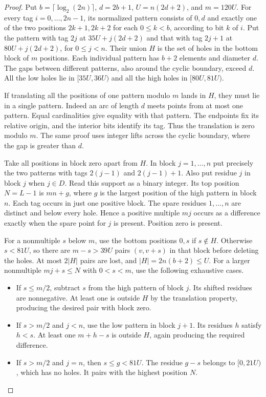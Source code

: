 \documentclass[11pt,letterpaper]{article}
\numberwithin{equation}{section}
\begin{document}
\begin{proof}

Put \(b=\lceil\log_2(2n)\rceil\), \(d=2b+1\), \(U=n(2d+2)\), and \(m=120U\). For every tag
\(i=0,\ldots,2n-1\), its normalized pattern consists of \(0,d\) and exactly one of the two
positions \(2k+1,2k+2\) for each \(0\le k<b\), according to bit \(k\) of \(i\). Put the
pattern with tag \(2j\) at \(35U+j(2d+2)\) and that with tag \(2j+1\) at \(80U+j(2d+2)\), for
\(0\le j<n\). Their union \(H\) is the set of holes in the bottom block of \(m\) positions.
Each individual pattern has \(b+2\) elements and diameter \(d\). The gaps between different
patterns, also around the cyclic boundary, exceed \(d\). All the low holes lie in
\([35U,36U)\) and all the high holes in \([80U,81U)\).

If translating all the positions of one pattern modulo \(m\) lands in \(H\), they must lie in
a single pattern. Indeed an arc of length \(d\) meets points from at most one pattern. Equal
cardinalities give equality with that pattern. The endpoints fix its relative origin, and the
interior bits identify its tag. Thus the translation is zero modulo \(m\). The same proof uses
integer lifts across the cyclic boundary, where the gap is greater than \(d\).

Take all positions in block zero apart from \(H\). In block \(j=1,\ldots,n\) put precisely the
two patterns with tags \(2(j-1)\) and \(2(j-1)+1\). Also put residue \(j\) in block \(j\) when
\(j\in D\). Read this support as a binary integer. Its top position \(N=L-1\) is \(mn+g\),
where \(g\) is the largest position of the high pattern in block \(n\). Each tag occurs in
just one positive block. The spare residues \(1,\ldots,n\) are distinct and below every hole.
Hence a positive multiple \(mj\) occurs as a difference exactly when the spare point for \(j\)
is present. Position zero is present.

For a nonmultiple \(s\) below \(m\), use the bottom positions \(0,s\) if \(s\notin H\).
Otherwise \(s<81U\), so there are \(m-s>39U\) pairs \((v,v+s)\) in that block before deleting
the holes. At most \(2|H|\) pairs are lost, and \(|H|=2n(b+2)\le U\). For a larger nonmultiple
\(mj+s\le N\) with \(0<s<m\), use the following exhaustive cases.

\begin{itemize}
\item If \(s\le m/2\), subtract \(s\) from the high pattern of block \(j\). Its shifted residues are nonnegative. At least one is outside \(H\) by the translation property, producing the desired pair with block zero.
\item If \(s>m/2\) and \(j<n\), use the low pattern in block \(j+1\). Its residues \(h\) satisfy \(h<s\). At least one \(m+h-s\) is outside \(H\), again producing the required difference.
\item If \(s>m/2\) and \(j=n\), then \(s\le g<81U\). The residue \(g-s\) belongs to \([0,21U)\), which has no holes. It pairs with the highest position \(N\).
\end{itemize}


\end{proof}
\end{document}
